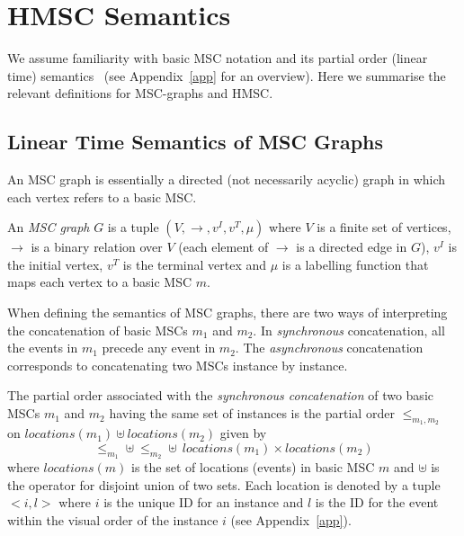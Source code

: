 \documentclass{entcs}
\begin{document}
\section{HMSC Semantics}\label{hmsc-sem}

We assume familiarity with basic MSC notation and its 
partial order (linear time) semantics~\cite{Alur96}
(see Appendix~\ref{app} for an overview).
Here we summarise the relevant definitions
for MSC-graphs and HMSC.

\subsection{Linear Time Semantics of MSC Graphs}\label{mscgraph1}

An MSC graph is essentially a directed (not necessarily 
acyclic) graph in which each vertex refers to a basic MSC. 


\begin{definition}
\label{mscgraph}
An {\em{MSC graph}} $G$ is a tuple $(V,\rightarrow,v^I,v^T,\mu)$ 
where $V$ is a finite set of vertices, $\rightarrow$ is a 
binary relation over $V$ (each element of $\rightarrow$ is 
a directed edge in $G$), $v^I$ is the initial vertex, 
$v^T$ is the terminal vertex and $\mu$ is a labelling 
function that maps each vertex to a basic MSC $m$.
\end{definition}

When defining the semantics of MSC graphs, there are two ways of interpreting the
concatenation of basic MSCs $m_1$ and $m_2$. In \emph{synchronous} concatenation,
all the events in $m_1$ precede any event in $m_2$. The \emph{asynchronous} concatenation
corresponds to concatenating two MSCs instance by instance.

\begin{definition}
\label{msc-synch-concat}
The partial order associated with the \emph{synchronous
concatenation} of two basic MSCs $m_1$ and $m_2$ having
the same set of instances is the partial order
$\leq_{m_1,m_2}$ on $locations(m_1) \uplus locations(m_2)$ given by 
$$ \leq_{m_1} \uplus \leq_{m_2} \uplus~ locations(m_1) \times locations(m_2)$$
where $locations(m)$ is the set of locations (events)
in basic MSC $m$ and $\uplus$ is the operator for disjoint
union of two sets. Each location is denoted by a tuple 
$<i,l>$ where $i$ is the unique ID for an instance and
$l$ is the ID for the event within the visual order of
the instance $i$ (see Appendix~\ref{app}).
\end{definition}
\end{document}
